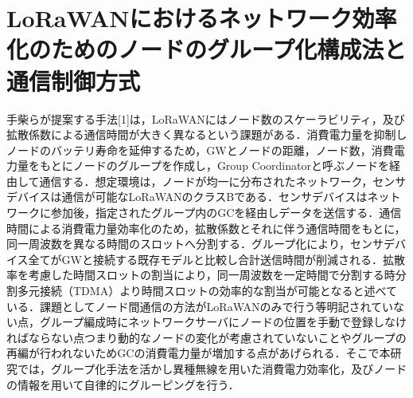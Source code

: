 \section{LoRaWANにおけるネットワーク効率化のためのノードのグループ化構成法と通信制御方式}
手柴らが提案する手法[1]は，LoRaWANにはノード数のスケーラビリティ，及び拡散係数による通信時間が大きく異なるという課題がある．消費電力量を抑制しノードのバッテリ寿命を延伸するため，GWとノードの距離，ノード数，消費電力量をもとにノードのグループを作成し，Group Coordinatorと呼ぶノードを経由して通信する．想定環境は，ノードが均一に分布されたネットワーク，センサデバイスは通信が可能なLoRaWANのクラスBである．センサデバイスはネットワークに参加後，指定されたグループ内のGCを経由しデータを送信する．通信時間による消費電力量効率化のため，拡散係数とそれに伴う通信時間をもとに，同一周波数を異なる時間のスロットへ分割する．グループ化により，センサデバイス全てがGWと接続する既存モデルと比較し合計送信時間が削減される．拡散率を考慮した時間スロットの割当により，同一周波数を一定時間で分割する時分割多元接続（TDMA）より時間スロットの効率的な割当が可能となると述べている．課題としてノード間通信の方法がLoRaWANのみで行う等明記されていない点，グループ編成時にネットワークサーバにノードの位置を手動で登録しなければならない点つまり動的なノードの変化が考慮されていないことやグループの再編が行われないためGCの消費電力量が増加する点があげられる．そこで本研究では，グループ化手法を活かし異種無線を用いた消費電力効率化，及びノードの情報を用いて自律的にグルーピングを行う．